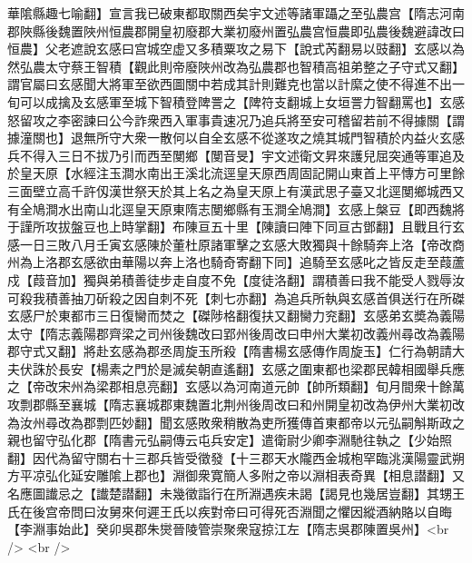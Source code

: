 華隂縣趣七喻翻】宣言我已破東都取關西矣宇文述等諸軍躡之至弘農宫【隋志河南郡陜縣後魏置陜州恒農郡開皇初廢郡大業初廢州置弘農宫恒農即弘農後魏避諱改曰恒農】父老遮說玄感曰宫城空虚又多積粟攻之易下【說式芮翻易以豉翻】玄感以為然弘農太守蔡王智積【觀此則帝廢陜州改為弘農郡也智積高祖弟整之子守式又翻】謂官屬曰玄感聞大將軍至欲西圖關中若成其計則難克也當以計縻之使不得進不出一旬可以成擒及玄感軍至城下智積登陴詈之【陴符支翻城上女垣詈力智翻罵也】玄感怒留攻之李密諫曰公今詐衆西入軍事貴速况乃追兵將至安可稽留若前不得據關【謂據潼關也】退無所守大衆一散何以自全玄感不從遂攻之燒其城門智積於内益火玄感兵不得入三日不拔乃引而西至閺鄉【閺音旻】宇文述衛文昇來護兒屈突通等軍追及於皇天原【水經注玉澗水南出王溪北流逕皇天原西周固記開山東首上平慱方可里餘三面壁立高千許仭漢世祭天於其上名之為皇天原上有漢武思子臺又北逕閺鄉城西又有全鳩澗水出南山北逕皇天原東隋志閺鄉縣有玉澗全鳩澗】玄感上槃豆【即西魏將于謹所攻拔盤豆也上時掌翻】布陳亘五十里【陳讀曰陣下同亘古鄧翻】且戰且行玄感一日三敗八月壬寅玄感陳於董杜原諸軍擊之玄感大敗獨與十餘騎奔上洛【帝改商州為上洛郡玄感欲由華陽以奔上洛也騎奇寄翻下同】追騎至玄感叱之皆反走至葭蘆戍【葭音加】獨與弟積善徒步走自度不免【度徒洛翻】謂積善曰我不能受人戮辱汝可殺我積善抽刀斫殺之因自刺不死【刺七亦翻】為追兵所執與玄感首俱送行在所磔玄感尸於東都市三日復臠而焚之【磔陟格翻復扶又翻臠力兖翻】玄感弟玄奬為義陽太守【隋志義陽郡齊梁之司州後魏改曰郢州後周改曰申州大業初改義州尋改為義陽郡守式又翻】將赴玄感為郡丞周旋玉所殺【隋書楊玄感傳作周旋玉】仁行為朝請大夫伏誅於長安【楊素之門於是滅矣朝直遙翻】玄感之圍東都也梁郡民韓相國舉兵應之【帝改宋州為梁郡相息亮翻】玄感以為河南道元帥【帥所類翻】旬月間衆十餘萬攻剽郡縣至襄城【隋志襄城郡東魏置北荆州後周改曰和州開皇初改為伊州大業初改為汝州尋改為郡剽匹妙翻】聞玄感敗衆稍散為吏所獲傳首東都帝以元弘嗣斛斯政之親也留守弘化郡【隋書元弘嗣傳云屯兵安定】遣衛尉少卿李淵馳往執之【少始照翻】因代為留守關右十三郡兵皆受徵發【十三郡天水隴西金城枹罕臨洮漢陽靈武朔方平凉弘化延安雕隂上郡也】淵御衆寛簡人多附之帝以淵相表奇異【相息譛翻】又名應圖䜟忌之【䜟楚譛翻】未幾徵詣行在所淵遇疾未謁【謁見也幾居豈翻】其甥王氏在後宫帝問曰汝舅來何遲王氏以疾對帝曰可得死否淵聞之懼因縱酒納賂以自晦【李淵事始此】癸卯吳郡朱爕晉陵管崇聚衆寇掠江左【隋志吳郡陳置吳州】<br />
<br />
